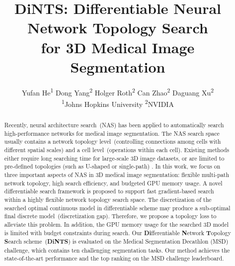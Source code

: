 \documentclass[final]{cvpr}
\begin{document}
\title{DiNTS: Differentiable Neural Network Topology Search\\for 3D Medical Image Segmentation}




\author{Yufan He\textsuperscript{1} \quad Dong Yang\textsuperscript{2}  \quad Holger Roth\textsuperscript{2}  \quad Can Zhao\textsuperscript{2}  \quad Daguang Xu\textsuperscript{2}\\
\textsuperscript{1}Johns Hopkins University \quad \textsuperscript{2}NVIDIA}


\maketitle



\begin{abstract}
   Recently, neural architecture search~(NAS) has been applied to automatically search high-performance networks for medical image segmentation.  The NAS search space usually contains a network topology level~(controlling connections among cells with different spatial scales) and a cell level~(operations within each cell). Existing methods either require long searching time for large-scale 3D image datasets, or are limited to pre-defined topologies (such as U-shaped or single-path) . In this work, we focus on three important aspects of NAS in 3D medical image segmentation: flexible multi-path network topology, high search efficiency, and budgeted GPU memory usage. A novel differentiable search framework is proposed to support fast gradient-based search within a highly flexible network topology search space. The discretization of the searched optimal continuous model in differentiable scheme may produce a sub-optimal final discrete model~(discretization gap). Therefore, we propose a topology loss to alleviate this problem. In addition, the GPU memory usage for the searched 3D model is limited with budget constraints during search. Our \textbf{Di}fferentiable \textbf{N}etwork \textbf{T}opology \textbf{S}earch scheme~(\textbf{DiNTS}) is evaluated on the Medical Segmentation Decathlon (MSD) challenge, which contains ten challenging segmentation tasks. Our method achieves the state-of-the-art performance and the top ranking on the MSD challenge leaderboard.
\end{abstract}
\end{document}
